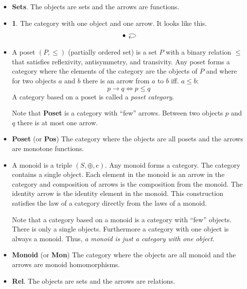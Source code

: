 \documentclass{book}
\theoremstyle{definition}
\begin{document}
\begin{itemize}
  \item \textbf{Sets}. The objects are sets and the arrows are functions.
  \item \textbf{1}. The category with one object and one arrow. It looks like this.
    \[
      \begin{tikzcd}
        \bullet \arrow[loop right]
      \end{tikzcd}
    \]
  \item A poset $(P, \leq)$ (partially ordered set) is a set $P$ with a binary
    relation $\leq$ that satisfies reflexivity, antisymmetry, and transivity.
    Any poset forms a category where the elements of the category are the
    objects of $P$ and where for two objects $a$ and $b$ there is an arrow from
    $a$ to $b$ iff. $a \leq b$:
    \[
      p \rightarrow q \iff p \leq q
    \]
    A category based on a poset is called a \emph{poset category}.

    Note that \textbf{Poset} is a category with ``few'' arrows. Between two
    objects $p$ and $q$ there is at most one arrow.


  \item \textbf{Poset} (or \textbf{Pos}) The category where the objects are all
    posets and the arrows are monotone functions.

  \item A monoid is a triple $(S, \oplus, e)$. Any monoid forms a category. The
    category contains a single object. Each element in the monoid is an arrow in
    the category and composition of arrows is the composition from the
    monoid. The identity arrow is the identity element in the monoid. This
    construction satisfies the law of a category directly from the laws of a
    monoid.

    Note that a category based on a monoid is a category with ``few'' objects.
    There is only a single objects. Furthermore a category with one object is
    always a monoid. Thus, \emph{a monoid is just a category with one object}.

  \item \textbf{Monoid} (or \textbf{Mon}) The category where the objects are all
    monoid and the arrows are monoid homomorphisms.

  \item \textbf{Rel}. The objects are sets and the arrows are relations.
\end{itemize}
\end{document}
